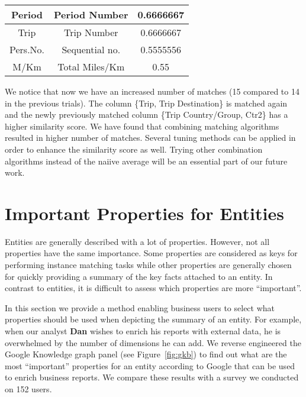 \begin{table}[ht]
{\begin{tabular}{|c|c|c|}
Period                         & Period Number                  & 0.6666667                         \\ \hline
Trip                           & Trip Number                    & 0.6666667                         \\ \hline
Pers.No.                       & Sequential no.                 & 0.5555556                         \\ \hline
M/Km                           & Total Miles/Km                 & 0.55                              \\ \hline
\end{tabular}}
\end{table}

We notice that now we have an increased number of matches (15 compared to 14 in the previous trials). The column \{Trip, Trip Destination\} is matched again and the newly previously matched column \{Trip Country/Group, Ctr2\} has a higher similarity score. We have found that combining matching algorithms resulted in higher number of matches. Several tuning methods can be applied in order to enhance the similarity score as well. Trying other combination algorithms instead of the naiive average will be an essential part of our future work.


\section{Important Properties for Entities}\label{Section:EKG}

Entities are generally described with a lot of properties. However, not all properties have the same importance. Some properties are considered as keys for performing instance matching tasks while other properties are generally chosen for quickly providing a summary of the key facts attached to an entity. In contrast to entities, it is difficult to assess which properties are more ``important''.

In this section we provide a method enabling business users to select what properties should be used when depicting the summary of an entity. For example, when our analyst \textbf{Dan} wishes to enrich his reports with external data, he is overwhelmed by the number of dimensions he can add. We reverse engineered the Google Knowledge graph panel (see Figure~\ref{fig:gkb}) to find out what are the most ``important'' properties for an entity according to Google that can be used to enrich business reports. We compare these results with a survey we conducted on 152 users.


